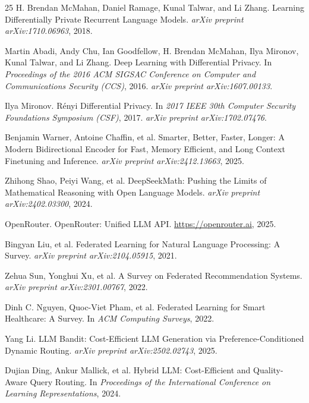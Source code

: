 \documentclass[11pt,a4paper]{article}
\begin{document}
\begin{thebibliography}{25}
H. Brendan McMahan, Daniel Ramage, Kunal Talwar, and Li Zhang.
\newblock Learning Differentially Private Recurrent Language Models.
\newblock \emph{arXiv preprint arXiv:1710.06963}, 2018.

Martin Abadi, Andy Chu, Ian Goodfellow, H. Brendan McMahan, Ilya Mironov, Kunal Talwar, and Li Zhang.
\newblock Deep Learning with Differential Privacy.
\newblock In \emph{Proceedings of the 2016 ACM SIGSAC Conference on Computer and Communications Security (CCS)}, 2016.
\newblock \emph{arXiv preprint arXiv:1607.00133}.

Ilya Mironov.
\newblock R\'enyi Differential Privacy.
\newblock In \emph{2017 IEEE 30th Computer Security Foundations Symposium (CSF)}, 2017.
\newblock \emph{arXiv preprint arXiv:1702.07476}.

Benjamin Warner, Antoine Chaffin, et al.
\newblock Smarter, Better, Faster, Longer: A Modern Bidirectional Encoder for Fast, Memory Efficient, and Long Context Finetuning and Inference.
\newblock \emph{arXiv preprint arXiv:2412.13663}, 2025.

Zhihong Shao, Peiyi Wang, et al.
\newblock DeepSeekMath: Pushing the Limits of Mathematical Reasoning with Open Language Models.
\newblock \emph{arXiv preprint arXiv:2402.03300}, 2024.

OpenRouter.
\newblock OpenRouter: Unified LLM API.
\newblock \url{https://openrouter.ai}, 2025.

Bingyan Liu, et al.
\newblock Federated Learning for Natural Language Processing: A Survey.
\newblock \emph{arXiv preprint arXiv:2104.05915}, 2021.

Zehua Sun, Yonghui Xu, et al.
\newblock A Survey on Federated Recommendation Systems.
\newblock \emph{arXiv preprint arXiv:2301.00767}, 2022.

Dinh C. Nguyen, Quoc-Viet Pham, et al.
\newblock Federated Learning for Smart Healthcare: A Survey.
\newblock In \emph{ACM Computing Surveys}, 2022.

Yang Li.
\newblock LLM Bandit: Cost-Efficient LLM Generation via Preference-Conditioned Dynamic Routing.
\newblock \emph{arXiv preprint arXiv:2502.02743}, 2025.

Dujian Ding, Ankur Mallick, et al.
\newblock Hybrid LLM: Cost-Efficient and Quality-Aware Query Routing.
\newblock In \emph{Proceedings of the International Conference on Learning Representations}, 2024.


\end{thebibliography}
\end{document}
